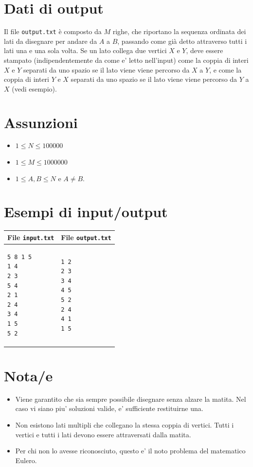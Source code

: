 \documentclass[a4paper,11pt]{article}
\begin{document}
\section*{Dati di output}
  
Il file \texttt{output.txt} è composto da $M$
righe, 
che riportano la sequenza ordinata dei lati da disegnare per andare
da $A$ a $B$, passando come già detto attraverso tutti i lati una e una sola volta.
Se un lato collega due vertici $X$ e $Y$, deve
essere stampato (indipendentemente da come e' letto nell'input) come
la coppia di interi $X$ e $Y$ separati da uno spazio
se il lato viene viene percorso da $X$ a $Y$, e come
la coppia di interi $Y$ e $X$ separati da uno spazio
se il lato viene viene percorso da $Y$ a $X$ (vedi esempio).

  \section*{Assunzioni}
  \begin{itemize}
  
    \item $1 ≤ N ≤ 100000$
    \item $1 ≤ M ≤ 1000000$
    \item $1 ≤ A, B ≤ N$ e $A ≠ B$.
  \end{itemize}

\section*{Esempi di input/output}

  
    \noindent
    \begin{tabular}{p{11cm}|p{5cm}}
    \toprule
    \textbf{File \texttt{input.txt}}
    & \textbf{File \texttt{output.txt}}
    \\
    \midrule
    \scriptsize
    \begin{verbatim}
5 8 1 5
1 4
2 3
5 4
2 1
2 4
3 4
1 5
5 2
\end{verbatim}
    &
    \scriptsize
    \begin{verbatim}
1 2
2 3
3 4
4 5
5 2
2 4
4 1
1 5
\end{verbatim}
    \\
    \bottomrule
    \end{tabular}
  
\section*{Nota/e}
\begin{itemize}
  
    \item 
Viene garantito che sia sempre possibile disegnare senza alzare la matita. Nel caso vi siano piu' soluzioni valide, e' sufficiente restituirne una.

    \item 
Non esistono lati multipli che collegano la stessa coppia di vertici. Tutti i vertici e tutti i lati devono essere attraversati dalla matita.

    \item 
Per chi non lo avesse riconosciuto, questo e' il noto problema del matematico Eulero.

\end{itemize}
\end{document}
